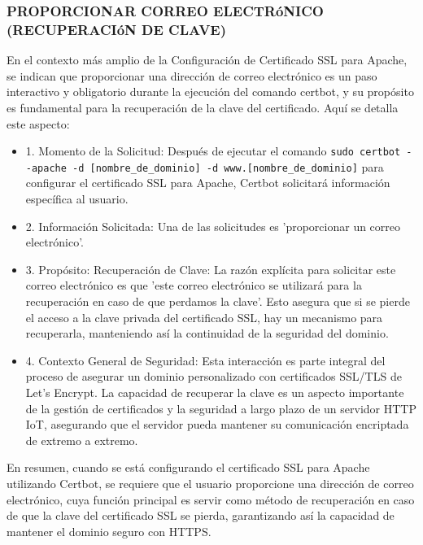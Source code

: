 \documentclass{report}
\begin{document}
\subsubsection{PROPORCIONAR CORREO ELECTRóNICO (RECUPERACIóN DE CLAVE)}
En el contexto más amplio de la Configuración de Certificado SSL para Apache, se  indican que proporcionar una dirección de 
correo electrónico es un paso interactivo y obligatorio durante la ejecución del comando certbot, y su propósito es fundamental 
para la recuperación de la clave del certificado.
Aquí se detalla este aspecto:
\begin{itemize}
    \item 1. Momento de la Solicitud: Después de ejecutar el comando \verb|sudo certbot --apache -d [nombre_de_dominio] -d www.[nombre_de_dominio]| 
    para configurar el certificado SSL para Apache, Certbot solicitará información específica al usuario.
    \item 2. Información Solicitada: Una de las solicitudes es 'proporcionar un correo electrónico'.
    \item 3. Propósito: Recuperación de Clave: La razón explícita para solicitar este correo electrónico es que 
    'este correo electrónico se utilizará para la recuperación en caso de que perdamos la clave'. Esto asegura que si se pierde 
    el acceso a la clave privada del certificado SSL, hay un mecanismo para recuperarla, manteniendo así la continuidad 
    de la seguridad del dominio.
    \item 4. Contexto General de Seguridad: Esta interacción es parte integral del proceso de asegurar un dominio personalizado 
    con certificados SSL/TLS de Let's Encrypt. La capacidad de recuperar la clave es un aspecto importante de la gestión de certificados 
    y la seguridad a largo plazo de un servidor HTTP IoT, asegurando que el servidor pueda mantener su comunicación 
    encriptada de extremo a extremo.
\end{itemize}
En resumen, cuando se está configurando el certificado SSL para Apache utilizando Certbot, se requiere que el usuario proporcione 
una dirección de correo electrónico, cuya función principal es servir como método de recuperación en caso de que la clave del 
certificado SSL se pierda, garantizando así la capacidad de mantener el dominio seguro con HTTPS.
\end{document}
